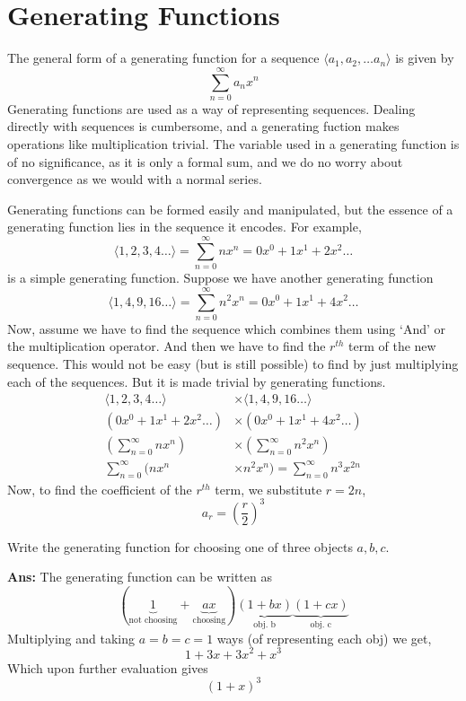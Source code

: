 \chapter{Generating Functions}
The general form of a generating function for a sequence \mbox{$\langle a_1, a_2, \dots a_n\rangle$} is given by
\[
    \sum_{n=0}^{\infty}a_n x^n
\]
Generating functions are used as a way of representing sequences. Dealing directly with sequences is cumbersome, and a generating fuction makes operations like multiplication trivial. The variable used in a generating function is of no significance, as it is only a formal sum, and we do no worry about convergence as we would with a normal series.

Generating functions can be formed easily and manipulated, but the essence of a generating function lies in the sequence it encodes. For example,
\[
    \langle1,2,3,4\dots\rangle = \sum_{n=0}^{\infty} nx^n = 0x^0 + 1x^1 + 2x^2 \dots
\]
is a simple generating function. Suppose we have another generating function
\[
    \langle1,4,9,16 \dots\rangle =  \sum_{n=0}^{\infty} n^2x^n = 0x^0 + 1x^1 + 4x^2 \dots
\]
Now, assume we have to find the sequence which combines them using `And' or the multiplication operator. And then we have to find the \mbox{$r^{th}$} term of the new sequence. This would not be easy (but is still possible) to find by just multiplying each of the sequences. But it is made trivial by generating functions.
\begin{align*}
    \langle1,2,3,4\dots\rangle & \times \langle1,4,9,16 \dots\rangle \\
    (0x^0 + 1x^1 + 2x^2 \dots) & \times (0x^0 + 1x^1 + 4x^2 \dots)   \\
    (\sum_{n=0}^{\infty} nx^n) & \times (\sum_{n=0}^{\infty} n^2x^n) \\
    \sum_{n=0}^{\infty} (nx^n  & \times n^2 x^n)
    = \sum_{n=0}^{\infty} n^3 x^{2n}
\end{align*}
Now, to find the coefficient of the \mbox{$r^{th}$} term, we substitute \mbox{$r = 2n$},
\[
    a_r = \left(\frac{r}{2}\right)^3
\]

\begin{example}
    Write the generating function for choosing one of three objects \mbox{$a,b,c$}.

    \textbf{Ans:} The generating function can be written as
    \[
        (\underbrace{1}_{\text{not choosing}}+\underbrace{ax}_{\text{choosing}})\underbrace{(1+bx)}_{\text{obj. b}}\underbrace{(1+cx)}_{\text{obj. c}}
    \]
    Multiplying and taking \mbox{$a=b=c=1$} ways (of representing each obj) we get,
    \[
        1+3x+3x^2+x^3
    \]
    Which upon further evaluation gives
    \[
        (1+x)^3
    \]
\end{example}

